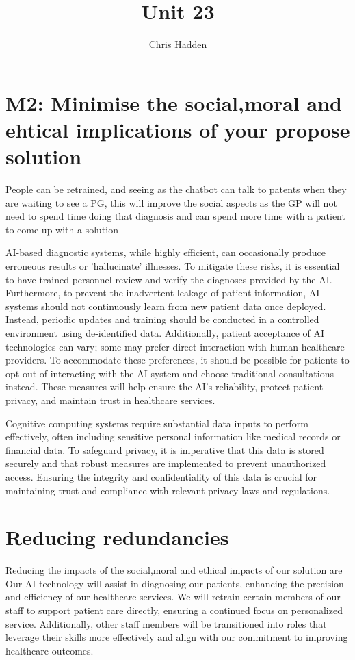 \documentclass{article}
\title{Unit 23}
\author{Chris Hadden}
\date{}
\begin{document}
\maketitle

\section{M2: Minimise the social,moral and ehtical implications of your propose solution}

People can be retrained, and seeing as the chatbot can talk to patents when they are waiting to see a PG, this will improve the social aspects as the GP will not need to spend time doing that diagnosis and can spend more time with a patient to come up with a solution


AI-based diagnostic systems, while highly efficient, can occasionally produce erroneous results or 'hallucinate' illnesses. To mitigate these risks, it is essential to have trained personnel review and verify the diagnoses provided by the AI. Furthermore, to prevent the inadvertent leakage of patient information, AI systems should not continuously learn from new patient data once deployed. Instead, periodic updates and training should be conducted in a controlled environment using de-identified data. Additionally, patient acceptance of AI technologies can vary; some may prefer direct interaction with human healthcare providers. To accommodate these preferences, it should be possible for patients to opt-out of interacting with the AI system and choose traditional consultations instead. These measures will help ensure the AI's reliability, protect patient privacy, and maintain trust in healthcare services.


Cognitive computing systems require substantial data inputs to perform effectively, often including sensitive personal information like medical records or financial data. To safeguard privacy, it is imperative that this data is stored securely and that robust measures are implemented to prevent unauthorized access. Ensuring the integrity and confidentiality of this data is crucial for maintaining trust and compliance with relevant privacy laws and regulations.

\section{Reducing redundancies}
Reducing the impacts of the social,moral and ethical impacts of our solution are  
Our AI technology will assist in diagnosing our patients, enhancing the precision and efficiency of our healthcare services. We will retrain certain members of our staff to support patient care directly, ensuring a continued focus on personalized service. Additionally, other staff members will be transitioned into roles that leverage their skills more effectively and align with our commitment to improving healthcare outcomes.
\end{document}
